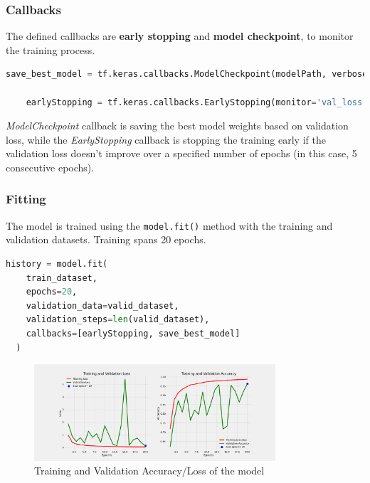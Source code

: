 \subsubsection{Callbacks}

The defined callbacks are \textbf{early stopping} and \textbf{model checkpoint}, to monitor the training process.

\begin{lstlisting}[language=Python]
	save_best_model = tf.keras.callbacks.ModelCheckpoint(modelPath, verbose=True, monitor='val_loss', save_best_only=True, save_weights_only=True)

	earlyStopping = tf.keras.callbacks.EarlyStopping(monitor='val_loss', patience=5)
\end{lstlisting}

\textit{ModelCheckpoint} callback is saving the best model weights based on validation loss, while the 
\textit{EarlyStopping} callback is stopping the training early if the validation loss doesn't improve over a 
specified number of epochs (in this case, 5 consecutive epochs). 

\subsubsection{Fitting}
The model is trained using the \texttt{model.fit()} method with the training and validation datasets. 
Training spans 20 epochs.

\begin{lstlisting}[language=Python]
	history = model.fit(
    train_dataset,
    epochs=20,
    validation_data=valid_dataset,
    validation_steps=len(valid_dataset),
    callbacks=[earlyStopping, save_best_model]
  )
\end{lstlisting}

\begin{figure}[H]
    \centering
    \includegraphics[width= 0.8\textwidth]{assets/scratch/32relu6_64_128_256_512_512_Drp_256d.png} 
    \caption{Training and Validation Accuracy/Loss of the model} 
    \label{fig:immagine}
\end{figure}

